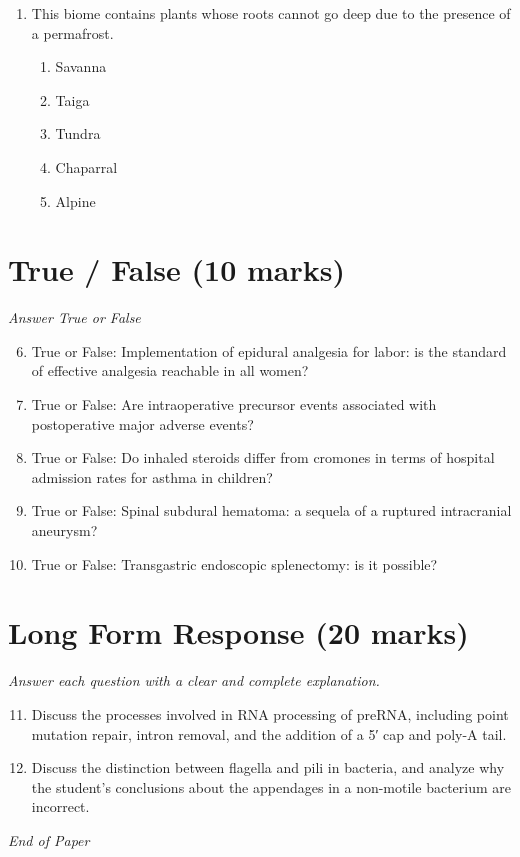 \documentclass[12pt]{article}
\begin{document}
\begin{enumerate}[label=\arabic*.]
\begin{enumerate}[label=(\alph*)]
    \item blastoderm
    \item mesoderm
    \item amnion
    \item zona pellucida
    \item ectoderm
\end{enumerate}
\item This biome contains plants whose roots cannot go deep due to the presence of a permafrost.
\begin{enumerate}[label=(\alph*)]
    \item Savanna
    \item Taiga
    \item Tundra
    \item Chaparral
    \item Alpine
\end{enumerate}
\end{enumerate}

\section*{True / False (10 marks)}
\textit{Answer True or False}
\begin{enumerate}[label=\arabic*.]
\setcounter{enumi}{5}
\item True or False: Implementation of epidural analgesia for labor: is the standard of effective analgesia reachable in all women?
\item True or False: Are intraoperative precursor events associated with postoperative major adverse events?
\item True or False: Do inhaled steroids differ from cromones in terms of hospital admission rates for asthma in children?
\item True or False: Spinal subdural hematoma: a sequela of a ruptured intracranial aneurysm?
\item True or False: Transgastric endoscopic splenectomy: is it possible?
\end{enumerate}

\section*{Long Form Response (20 marks)}
\textit{Answer each question with a clear and complete explanation.}
\begin{enumerate}[label=\arabic*.]
\setcounter{enumi}{10}
\item Discuss the processes involved in RNA processing of preRNA, including point mutation repair, intron removal, and the addition of a 5′ cap and poly-A tail.
\item Discuss the distinction between flagella and pili in bacteria, and analyze why the student's conclusions about the appendages in a non-motile bacterium are incorrect.
\end{enumerate}

\vfill
\noindent\textit{End of Paper}
\end{document}
